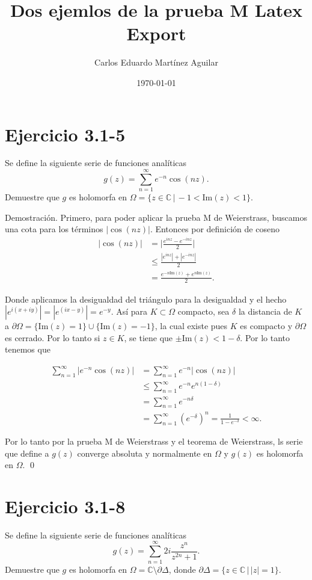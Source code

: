 \documentclass[letterpaper]{article}
\author{Carlos Eduardo Martínez Aguilar}
\date{\today}
\title{Dos ejemlos de la prueba M Latex Export}
\newcommand{\dem}{{\noindent \sc Demostraci\'on. }}
\newcommand{\om}{\ensuremath{\Omega}}
\newcommand{\co}{\ensuremath{\mathbb C }}
\begin{document}
\maketitle
\tableofcontents

\section{Ejercicio 3.1-5}
\label{sec:org190ee27}
Se define la siguiente serie de funciones analíticas
\[
g(z)=\sum_{n=1}^{\infty}e^{-n}\cos(nz).
\]
Demuestre que \(g\) es holomorfa en \(\om=\{z\in\co\,|\,-1<\mathrm{Im}(z)<1\}\).

\dem Primero, para poder aplicar la prueba M de Weierstrass, buscamos una cota para los términos \(|\cos(nz)|\). Entonces por definición de coseno
\begin{align*}
|\cos(nz)|&=\big|\frac{e^{inz}-e^{-inz}}{2}\big|\\
&\leq\frac{|e^{inz}|+|e^{-inz}|}{2}\\
&=\frac{e^{-n\mathrm{Im}(z)}+e^{n\mathrm{Im}(z)}}{2}.
\end{align*}

\noindent Donde aplicamos la desigualdad del triángulo para la desigualdad y el hecho \(|e^{i(x+iy)}|=|e^{(ix-y)}|=e^{-y}\). Así para \(K\subset\om\) compacto, sea \(\delta\) la distancia de \(K\) a \(\partial\om=\{\mathrm{Im}(z)=1\}\cup\{\mathrm{Im}(z)=-1\}\), la cual existe pues \(K\) es compacto y \(\partial\om\) es cerrado. Por lo tanto si \(z\in K\), se tiene que \(\pm\mathrm{Im}(z)<1-\delta\). Por lo tanto tenemos que

\begin{align*}
\sum_{n=1}^{\infty}|e^{-n}\cos(nz)|&=\sum_{n=1}^{\infty}e^{-n}|\cos(nz)|\\
&\leq \sum_{n=1}^{\infty}e^{-n}e^{n(1-\delta)}\\
&=\sum_{n=1}^{\infty}e^{-n\delta}\\
&=\sum_{n=1}^{\infty}(e^{-\delta})^n=\frac{1}{1-e^{-\delta}}<\infty.
\end{align*}

\noindent Por lo tanto por la prueba M de Weierstrass y el teorema de Weierstrass, ls serie que define a \(g(z)\) converge absoluta y normalmente en \(\om\) y \(g(z)\) es holomorfa en \(\om\).
\qed
\section{Ejercicio 3.1-8}
\label{sec:orgd449b61}
Se define la siguiente serie de funciones analíticas
\[
g(z)=\sum_{n=1}^{\infty}2i\frac{z^n}{z^{2n}+1}.
\]
Demuestre que \(g\) es holomorfa en \(\om=\co\setminus\partial\Delta\), donde \(\partial\Delta=\{z\in\co\,|\,|z|=1\}\).
\end{document}
